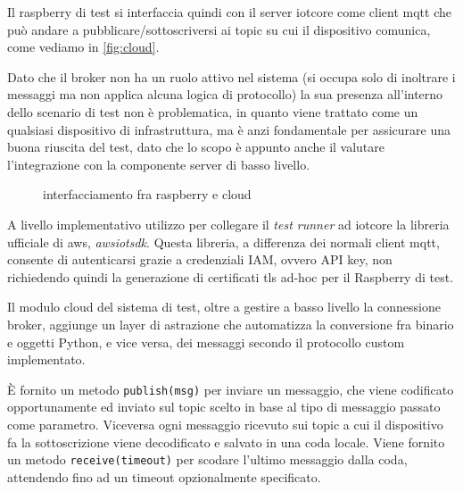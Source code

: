 \documentclass[12pt,a4paper,twoside,titlepage]{book}
\begin{document}
Il raspberry di test si interfaccia quindi con il server \Gls{iotcore} come client \Gls{mqtt} che può
andare a pubblicare/sottoscriversi ai \gls{topic} su cui il dispositivo comunica, come vediamo in \autoref{fig:cloud}.

Dato che il broker non ha un ruolo attivo nel sistema (si occupa solo di inoltrare i messaggi ma non
applica alcuna logica di protocollo) la sua presenza all'interno dello scenario di test non
è problematica, in quanto viene trattato come un qualsiasi dispositivo di infrastruttura, ma è anzi fondamentale 
per assicurare una buona riuscita del test, dato che lo scopo è appunto anche il valutare l'integrazione con la 
componente server di basso livello. 

\begin{figure}[h]
    \centering
    \caption{interfacciamento fra raspberry e cloud}
    \label{fig:cloud}
\end{figure}


A livello implementativo utilizzo per collegare il \textit{test runner} ad \Gls{iotcore}
la libreria ufficiale di \acrshort{aws}, \textit{awsiotsdk}. Questa libreria, a differenza dei
normali client \Gls{mqtt}, consente di autenticarsi grazie a credenziali IAM, ovvero API key, non
richiedendo quindi la generazione di certificati \acrshort{tls} ad-hoc per il Raspberry di test.

Il modulo cloud del sistema di test, oltre a gestire a basso livello la connessione
\gls{broker}, aggiunge un layer di astrazione che automatizza la conversione fra
binario e oggetti Python, e vice versa, dei messaggi secondo il protocollo custom
implementato.

È fornito un metodo \texttt{publish(msg)} per inviare un messaggio, che viene codificato opportunamente ed
inviato sul \gls{topic} scelto in base al tipo di messaggio passato come parametro. 
Viceversa ogni messaggio ricevuto sui \gls{topic} a cui il dispositivo fa la
sottoscrizione viene decodificato e salvato in una coda locale. Viene fornito un metodo \texttt{receive(timeout)}
per scodare l'ultimo messaggio dalla coda, attendendo fino ad un timeout opzionalmente specificato.
\end{document}
